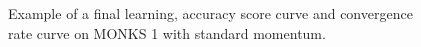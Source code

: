 \begin{appendices}
\begin{figure}[H]
\begin{subfigure}{0.40\textwidth}
{                    }
                    \caption{}
                    \label{fig:monks_1_ACC_SGD}
                \end{subfigure}
                \begin{subfigure}{0.40\textwidth}
                    \caption{}
                    \label{fig:monks_1_NORM_SGD}
                \end{subfigure}
                \caption{Example of a final learning, accuracy score curve and
                convergence rate curve on MONKS 1 with standard momentum.}
                \label{fig:monks_1_SGD}
            \end{figure}


\end{appendices}
